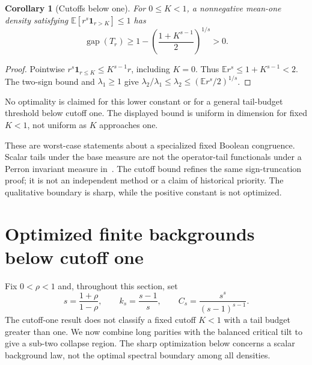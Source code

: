 \documentclass[11pt]{article}
\newtheorem{corollary}[theorem]{Corollary}
\newcommand{\gap}{\operatorname{gap}}
\begin{document}
\begin{corollary}[Cutoffs below one]\label{cor:cutoff-below-one}
For $0\le K<1$, a nonnegative mean-one density satisfying
$\mathbb E[r^s\mathbf1_{r>K}]\le1$ has
\[
 \gap(T_r)\ge1-\left(\frac{1+K^{s-1}}2\right)^{1/s}>0.
\]
\end{corollary}
\begin{proof}
Pointwise $r^s\mathbf1_{r\le K}\le K^{s-1}r$, including $K=0$.
Thus $\mathbb E r^s\le1+K^{s-1}<2$. The two-sign bound and
$\lambda_1\ge1$ give
$\lambda_2/\lambda_1\le\lambda_2\le(\mathbb E r^s/2)^{1/s}$.
\end{proof}
No optimality is claimed for this lower constant or for a general
tail-budget threshold below cutoff one. The displayed bound is uniform
in dimension for fixed $K<1$, not uniform as $K$ approaches one.

These are worst-case statements about a specialized fixed Boolean
congruence. Scalar tails under the base measure are not the operator-tail
functionals under a Perron invariant measure in~\cite{Wang}. The cutoff
bound refines the same sign-truncation proof; it is not an independent
method or a claim of historical priority. The qualitative boundary is
sharp, while the positive constant is not optimized.

\section{Optimized finite backgrounds below cutoff one}\label{sec:background}
Fix $0<\rho<1$ and, throughout this section, set
\[
 s=\frac{1+\rho}{1-\rho},\qquad k_s=\frac{s-1}{s},\qquad
 C_s=\frac{s^s}{(s-1)^{s-1}}.
\]
The cutoff-one result does not classify a fixed cutoff $K<1$ with
a tail budget greater than one. We now combine long parities with the
balanced critical tilt to give a sub-two collapse region. The sharp
optimization below concerns a scalar background law, not the optimal
spectral boundary among all densities.
\end{document}
